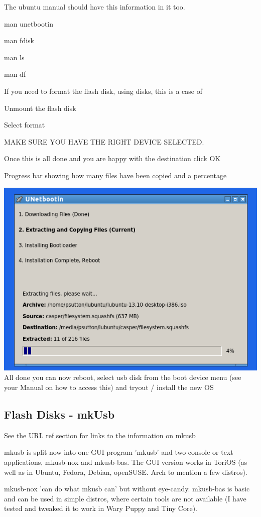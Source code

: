 \documentclass[12pt,a4paper]{book}
\begin{document}
The ubuntu manual should have this information in it too.

man unetbootin

man fdisk

man ls

man df

If you need to format the flash disk, using disks, this is a case of

Unmount the flash disk

Select format

MAKE SURE YOU HAVE THE RIGHT DEVICE SELECTED.

Once this is all done and you are happy with the destination click OK

Progress bar showing how many files have been copied and a percentage


\includegraphics[width=0.7\linewidth]{unetbootin5} \\

All done you can now reboot, select usb disk from the boot device menu (see your Manual on how to access this) and tryout /  install the new OS


\subsection{Flash Disks - mkUsb}

See the URL ref section for links to the information on mkusb \cite{mkUSB-Quick-Start-manual}

mkusb is split now into one GUI program 'mkusb' and two console or text
applications, mkusb-nox and mkusb-bas. The GUI version works in ToriOS
(as well as in Ubuntu, Fedora, Debian, openSUSE. Arch to mention a few
distros).

mkusb-nox 'can do what mkusb can' but without eye-candy. mkusb-bas is
basic and can be used in simple distros, where certain tools are not
available (I have tested and tweaked it to work in Wary Puppy and Tiny
Core).
\end{document}
